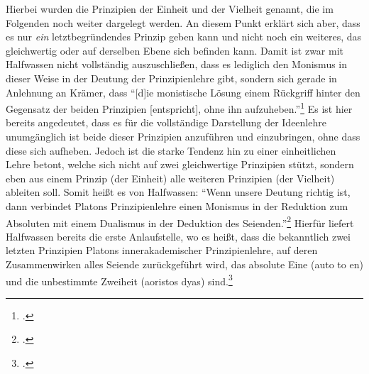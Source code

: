 Hierbei wurden die Prinzipien der Einheit und der Vielheit genannt, die im Folgenden noch weiter dargelegt werden. An diesem Punkt erklärt sich aber, dass es nur \emph{ein} letztbegründendes Prinzip geben kann und nicht noch ein weiteres, das gleichwertig oder auf derselben Ebene sich befinden kann.
Damit ist zwar mit Halfwassen nicht vollständig auszuschließen, dass es lediglich den Monismus in dieser Weise in der Deutung der Prinzipienlehre gibt, sondern sich gerade in Anlehnung an Krämer, dass \enquote{[d]ie monistische Lösung einem Rückgriff hinter den Gegensatz der beiden Prinzipien [entspricht], ohne ihn aufzuheben.}\footcite[vgl.][S. 333]{Krämer1964Geistmetaphysik} 
Es ist hier bereits angedeutet, dass es für die vollständige Darstellung der Ideenlehre unumgänglich ist beide dieser Prinzipien anzuführen und einzubringen, ohne dass diese sich aufheben. Jedoch ist die starke Tendenz hin zu einer einheitlichen Lehre betont, welche sich nicht auf zwei gleichwertige Prinzipien stützt, sondern eben aus einem Prinzip (der Einheit) alle weiteren Prinzipien (der Vielheit) ableiten soll. Somit heißt es von Halfwassen:
\enquote{Wenn unsere Deutung richtig ist, dann verbindet Platons Prinzipienlehre einen Monismus in der Reduktion zum Absoluten mit einem Dualismus in der Deduktion des Seienden.}\footcite[][S. 79]{HalfwassenMonismusDualismus} 
Hierfür liefert Halfwassen bereits die erste Anlaufstelle, wo es heißt, dass die bekanntlich zwei letzten Prinzipien Platons innerakademischer Prinzipienlehre, auf deren Zusammenwirken alles Seiende zurückgeführt wird, das absolute Eine (auto to en) und die unbestimmte Zweiheit (aoristos dyas) sind.\footcite[vgl.][S. 67]{HalfwassenMonismusDualismus}\\
